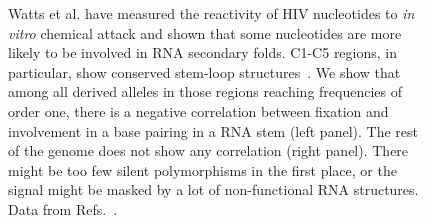 \documentclass[12pt,a4paper,notitlepage,onecolumn]{article}
\begin{document}
\begin{figure}
\begin{center}
\caption{Watts et al. have measured the reactivity of HIV nucleotides to {\it in
vitro} chemical attack and shown that some nucleotides are more likely to be
involved in RNA secondary folds. C1-C5 regions, in particular, show conserved
stem-loop structures~\citep{watts_architecture_2009}. We show that among all
derived alleles in those regions reaching frequencies of order one, there is a negative
correlation between fixation and involvement in a base pairing in a RNA stem
(left panel). The rest of the genome does not show any correlation (right
panel). There might be too few silent polymorphisms in the first place, or the
signal might be masked by a lot of non-functional RNA structures. Data from
Refs.~\cite{shankarappa_consistent_1999, bunnik_autologous_2008,
liu_selection_2006}.}
\end{center}
\end{figure}

\end{document}
